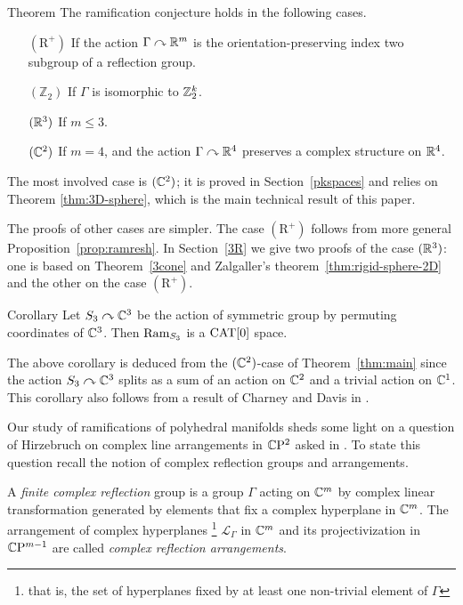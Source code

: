 \documentclass[oneside,a4paper]{article}
\begin{document}
\begin{thm}{Theorem}\label{thm:main}
The ramification conjecture holds in the following cases.
\begin{itemize}
\item[$(\mathrm{R}^+)$] If the action $\Gamma\curvearrowright\mathbb{R}^m$ is the orientation-preserving index two subgroup of a reflection group.
\item[$(\mathbb{Z}_2)$] If $\Gamma$ is isomorphic to $\mathbb{Z}_2^k$.
\item[$(\mathbb{R}^3)$]\label{3} If $m\le 3$.
\item[$(\mathbb{C}^2)$]\label{4}
If $m=4$, and the action $\Gamma\curvearrowright\mathbb{R}^4$
preserves a complex structure on $\mathbb{R}^4$.
\end{itemize}

\end{thm}

The most involved case is $(\mathbb{C}^2)$;
it is proved in Section~\ref{pkspaces} 
and relies on Theorem \ref{thm:3D-sphere},
which is the main technical result of this paper.

The proofs of other cases are simpler.
The case $(\mathrm{R}^+)$ follows from more general Proposition~\ref{prop:ramresh}.
In Section~\ref{3R}
we give two proofs of the case $(\mathbb{R}^3)$: one is based on Theorem~\ref{3cone} and Zalgaller's theorem~\ref{thm:rigid-sphere-2D}
and the other on the case $(\mathrm{R}^+)$.

\begin{thm}{Corollary}\label{cor:braid}
Let $S_3\curvearrowright\mathbb{C}^3$ be the action of symmetric group by permuting coordinates of $\mathbb{C}^3$.
Then $\mathop{\rm Ram}\nolimits_{S_3}$ is a $\mathrm{CAT}[0]$ space.
\end{thm}

The above corollary is deduced from the $(\mathbb{C}^2)$-case of Theorem~\ref{thm:main}
since the action $S_3\curvearrowright\mathbb{C}^3$ splits as a sum of an action on $\mathbb{C}^2$ and a trivial action on $\mathbb{C}^1$.
This corollary also follows from a result of Charney and Davis in \cite{charney-davis-93}.


Our study of ramifications of polyhedral manifolds sheds  some light on a question of Hirzebruch on complex line arrangements in $\mathbb{C}\mathrm{P}^2$ asked in \cite{Hirzebruch}. To state this question recall the notion of complex reflection groups and arrangements. 

A {\it finite complex reflection} group is a group $\Gamma$ acting on $\mathbb{C}^m$ by complex linear transformation generated by elements that fix a complex hyperplane in $\mathbb{C}^m$. 
The arrangement of complex hyperplanes%
\footnote{that is, the set of hyperplanes fixed by at least one non-trivial element of $\Gamma$} 
 $\mathcal{L}_\Gamma$ in $\mathbb{C}^m$ and its projectivization in $\mathbb{C}\mathrm{P}^{m-1}$ are called {\it complex reflection arrangements}.
\end{document}
